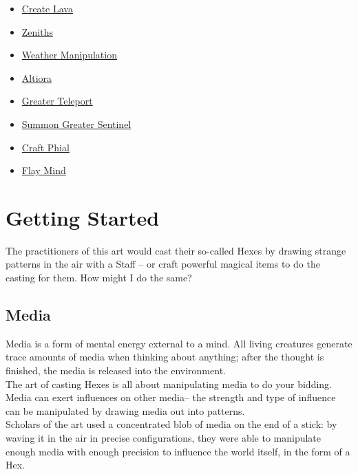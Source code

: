 \documentclass[12pt]{article}
\begin{document}
    \begin{itemize}
        \item\hyperref[ sec:patterns/great_spells/create_lava ]{ Create Lava}
        \item\hyperref[ sec:patterns/great_spells/zeniths ]{ Zeniths}
        \item\hyperref[ sec:patterns/great_spells/weather_manip ]{ Weather Manipulation}
        \item\hyperref[ sec:patterns/great_spells/altiora ]{ Altiora}
        \item\hyperref[ sec:patterns/great_spells/teleport ]{ Greater Teleport}
        \item\hyperref[ sec:patterns/great_spells/greater_sentinel ]{ Summon Greater Sentinel}
        \item\hyperref[ sec:patterns/great_spells/make_battery ]{ Craft Phial}
        \item\hyperref[ sec:patterns/great_spells/brainsweep ]{ Flay Mind}
    \end{itemize}
\newpage



\label{sec:basics}

\section*{Getting Started}
  The practitioners of this art would cast their so-called Hexes by drawing strange patterns in the air with a Staff -- or craft powerful magical items to do the casting for them. How might I do the same?\\



\label{sec:basics/media}
\subsection*{Media}


  
    Media is a form of mental energy external to a mind. All living creatures generate trace amounts of media when thinking about anything; after the thought is finished, the media is released into the environment.\\The art of casting Hexes is all about manipulating media to do your bidding.\\


  
    Media can exert influences on other media-- the strength and type of influence can be manipulated by drawing media out into patterns.\\Scholars of the art used a concentrated blob of media on the end of a stick: by waving it in the air in precise configurations, they were able to manipulate enough media with enough precision to influence the world itself, in the form of a Hex.\\
\end{document}
